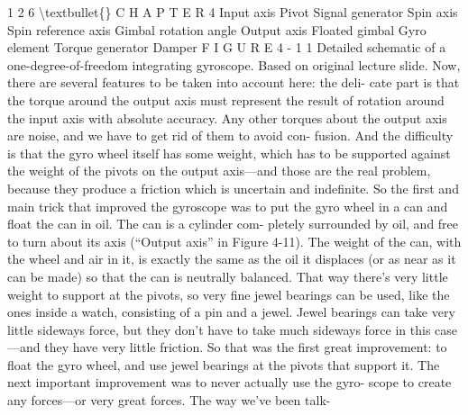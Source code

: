 \documentclass[10pt,oneside]{article}
\begin{document}
1 2 6 \textbackslash{}textbullet\{\} C H A P T E R  4 Input axis Pivot Signal generator Spin axis Spin reference axis Gimbal rotation angle Output axis Floated gimbal Gyro element Torque generator Damper F I G U R E  4 - 1 1 Detailed schematic of a one-degree-of-freedom integrating gyroscope. Based on original lecture slide. Now, there are several features to be taken into account here: the deli- cate part is that the torque around the output axis must represent the result of rotation around the input axis with absolute accuracy. Any other torques about the output axis are noise, and we have to get rid of them to avoid con- fusion. And the difficulty is that the gyro wheel itself has some weight, which has to be supported against the weight of the pivots on the output axis---and those are the real problem, because they produce a friction which is uncertain and indefinite. So the first and main trick that improved the gyroscope was to put the gyro wheel in a can and float the can in oil. The can is a cylinder com- pletely surrounded by oil, and free to turn about its axis (“Output axis” in Figure 4-11).  The weight of the can, with the wheel and air in it, is exactly the same as the oil it displaces (or as near as it can be made) so that the can is neutrally balanced. That way there’s very little weight to support at the pivots, so very fine jewel bearings can be used, like the ones inside a watch, consisting of a pin and a jewel. Jewel bearings can take very little sideways force, but they don’t have to take much sideways force in this case---and they have very little friction. So that was the first great improvement: to float the gyro wheel, and use jewel bearings at the pivots that support it. The next important improvement was to never actually use the gyro- scope to create any forces---or very great forces. The way we’ve been talk-\par
\end{document}
